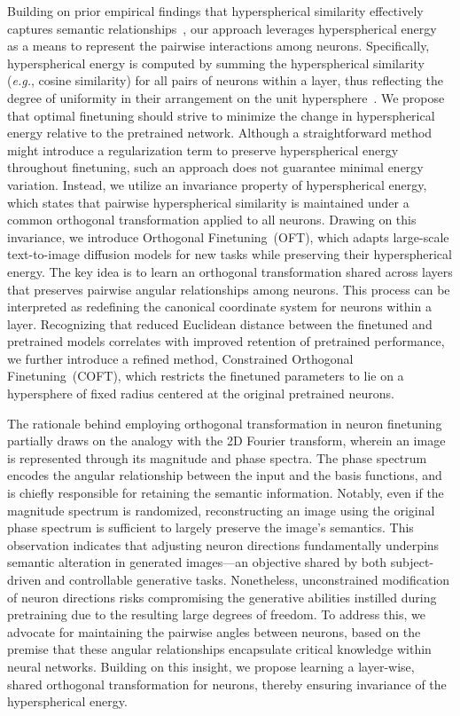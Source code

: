 Building on prior empirical findings that hyperspherical similarity effectively captures semantic relationships~\cite{liu2017deep,liu2018decoupled,chen2020angular}, our approach leverages hyperspherical energy~\cite{liu2018learning} as a means to represent the pairwise interactions among neurons. Specifically, hyperspherical energy is computed by summing the hyperspherical similarity (\emph{e.g.}, cosine similarity) for all pairs of neurons within a layer, thus reflecting the degree of uniformity in their arrangement on the unit hypersphere~\cite{liu2021learning}. We propose that optimal finetuning should strive to minimize the change in hyperspherical energy relative to the pretrained network. Although a straightforward method might introduce a regularization term to preserve hyperspherical energy throughout finetuning, such an approach does not guarantee minimal energy variation. Instead, we utilize an invariance property of hyperspherical energy, which states that pairwise hyperspherical similarity is maintained under a common orthogonal transformation applied to all neurons. Drawing on this invariance, we introduce Orthogonal Finetuning~(OFT), which adapts large-scale text-to-image diffusion models for new tasks while preserving their hyperspherical energy. The key idea is to learn an orthogonal transformation shared across layers that preserves pairwise angular relationships among neurons. This process can be interpreted as redefining the canonical coordinate system for neurons within a layer. Recognizing that reduced Euclidean distance between the finetuned and pretrained models correlates with improved retention of pretrained performance, we further introduce a refined method, Constrained Orthogonal Finetuning~(COFT), which restricts the finetuned parameters to lie on a hypersphere of fixed radius centered at the original pretrained neurons.

The rationale behind employing orthogonal transformation in neuron finetuning partially draws on the analogy with the 2D Fourier transform, wherein an image is represented through its magnitude and phase spectra. The phase spectrum encodes the angular relationship between the input and the basis functions, and is chiefly responsible for retaining the semantic information. Notably, even if the magnitude spectrum is randomized, reconstructing an image using the original phase spectrum is sufficient to largely preserve the image’s semantics. This observation indicates that adjusting neuron directions fundamentally underpins semantic alteration in generated images—an objective shared by both subject-driven and controllable generative tasks. Nonetheless, unconstrained modification of neuron directions risks compromising the generative abilities instilled during pretraining due to the resulting large degrees of freedom. To address this, we advocate for maintaining the pairwise angles between neurons, based on the premise that these angular relationships encapsulate critical knowledge within neural networks. Building on this insight, we propose learning a layer-wise, shared orthogonal transformation for neurons, thereby ensuring invariance of the hyperspherical energy.

